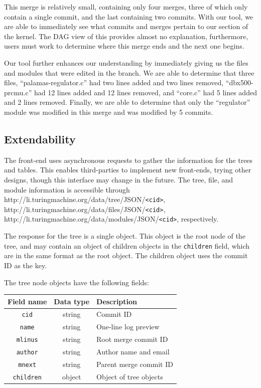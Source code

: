 \documentclass[conference, draftclsnofoot, draft]{IEEEtran}
\begin{document}
This merge is relatively small, containing only four merges, three of which
only contain a single commit, and the last containing two commits. With our
tool, we are able to immediately see what commits and merges pertain to our
section of the kernel. The DAG view of this provides almost no explanation,
furthermore, users must work to determine where this merge ends and the next one
begins.

Our tool further enhances our understanding by immediately giving us the files
and modules that were edited in the branch. We are able to determine that three
files, ``palamas-regulator.c'' had two lines added and two lines removed,
``dbx500-prcmu.c'' had 12 lines added and 12 lines removed, and ``core.c'' had 5
lines added and 2 lines removed. Finally, we are able to determine that only the
``regulator'' module was modified in this merge and was modified by 5 commits.

\subsection{Extendability}

The front-end uses asynchronous requests to gather the information for the trees and
tables. This enables third-parties to implement new front-ends, trying other
designs, though this interface may change in the future. The tree, file, and module
information is accessible through
http://li.turingmachine.org/data/tree/JSON/\verb|<cid>|,
http://li.turingmachine.org/data/files/JSON/\verb|<cid>|,
http://li.turingmachine.org/data/modules/JSON/\verb|<cid>|, respectively.

The response for the tree is a single object. This object is the root node of the
tree, and may contain an object of children objects in the \verb|children| field,
which are in the same format as the root object. The children object uses the commit
ID as the key.

The tree node objects have the following fields:

\begin{tabular}{ccl}
        Field name      & Data type & Description\\\hline
        \verb|cid|      & string    & Commit ID\\
        \verb|name|     & string    & One-line log preview\\
        \verb|mlinus|   & string    & Root merge commit ID\\
        \verb|author|   & string    & Author name and email\\
        \verb|mnext|    & string    & Parent merge commit ID\\
        \verb|children| & object    & Object of tree objects\\
\end{tabular}
\end{document}
